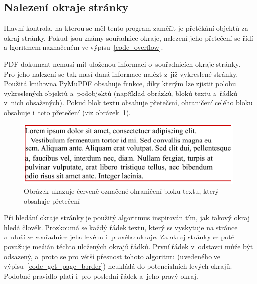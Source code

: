 \noindent\begin{minipage}{\linewidth}
    \hfill
    
\end{minipage}


\subsection*{Nalezení okraje stránky}
Hlavní kontrola, na kterou se měl tento program zaměřit je přetékání objektů za
okraj stránky. Pokud jsou známy souřadnice okraje, nalezení jeho přetečení
se řídí a
lgoritmem naznačeném ve výpisu~\ref{code_overflow}.

\noindent\begin{minipage}{\linewidth}
    \hfill
    
\end{minipage}

PDF dokument nemusí mít uloženou informaci o~souřadnicích okraje stránky. Pro
jeho nalezení se tak musí daná informace nalézt z~již vykreslené stránky.
Použitá knihovna PyMuPDF obsahuje funkce, díky kterým lze zjistit polohu
vykreslených objektů a~podobjektů (například obrázků, bloků textu a~řádků v~nich
obsažených). Pokud blok textu obsahuje přetečení, ohraničení celého bloku
obsahuje i~toto přetečení (viz obrázek~\ref{pic_block_bbox}).

\begin{figure}[H]
    \centering
    \includegraphics[width=0.7\linewidth]{obrazky-figures/block_bbox.pdf}
    \caption{Obrázek ukazuje červeně označené ohraničení bloku textu, který obsahuje přetečení}
    \label{pic_block_bbox}
\end{figure}

Při hledání okraje stránky je použitý algoritmus inspirován tím, jak takový
okraj hledá člověk. Prozkoumá se každý řádek textu, který se vyskytuje na
stránce a~uloží se souřadnice jeho levého i~pravého okraje. Za okraj stránky se
poté považuje medián těchto uložených okrajů řádků. První řádek v~odstavci 
může být odsazený, a~proto se pro větší přesnost tohoto algoritmu (uvedeného
ve výpisu~\ref{code_get_page_border}) neukládá do potenciálních levých okrajů.
Podobné pravidlo platí i~pro poslední řádek a~jeho pravý okraj.

